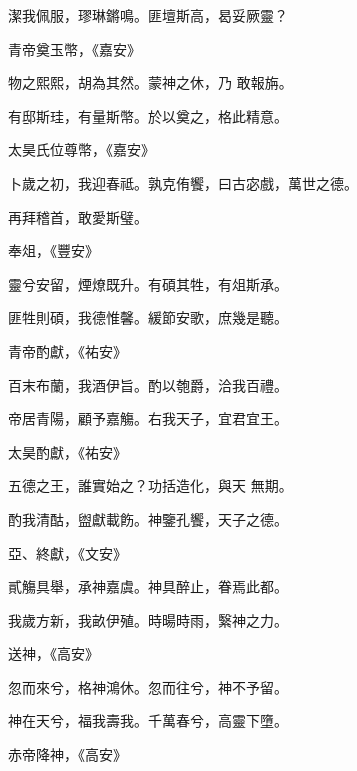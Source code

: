 \begin{pinyinscope}
 潔我佩服，璆琳鏘鳴。匪壇斯高，曷妥厥靈？



 青帝奠玉幣，《嘉安》



 物之熙熙，胡為其然。蒙神之休，乃
 敢報旃。



 有邸斯珪，有量斯幣。於以奠之，格此精意。



 太昊氏位尊幣，《嘉安》



 卜歲之初，我迎春祗。孰克侑饗，曰古宓戲，萬世之德。



 再拜稽首，敢愛斯璧。



 奉俎，《豐安》



 靈兮安留，煙燎既升。有碩其牲，有俎斯承。



 匪牲則碩，我德惟馨。緩節安歌，庶幾是聽。



 青帝酌獻，《祐安》



 百末布蘭，我酒伊旨。酌以匏爵，洽我百禮。



 帝居青陽，顧予嘉觴。右我天子，宜君宜王。



 太昊酌獻，《祐安》



 五德之王，誰實始之？功括造化，與天
 無期。



 酌我清酤，盥獻載飭。神鑒孔饗，天子之德。



 亞、終獻，《文安》



 貳觴具舉，承神嘉虞。神具醉止，眷焉此都。



 我歲方新，我畝伊殖。時暘時雨，繄神之力。



 送神，《高安》



 忽而來兮，格神鴻休。忽而往兮，神不予留。



 神在天兮，福我壽我。千萬春兮，高靈下墮。



 赤帝降神，《高安》




\end{pinyinscope}
